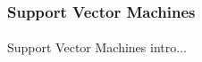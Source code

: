 \subsubsection{Support Vector Machines}

\paragraph{}
	Support Vector Machines intro...
	
\paragraph{}
	